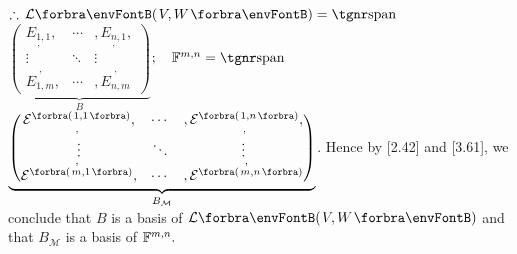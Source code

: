 \documentclass[a4paper, 11pt, UTF8]{article}
\begin{document}
\begin{large}
$\therefore\,\Lm{V,W}=\Spn${\normalsize$\underbrace{\begin{pmatrix} \underset{,}{E_{1,1}}, & \cdots & ,\underset{,}{E_{n,1}},\\ \vdots & \ddots & \vdots\\ \overset{,}{E_{1,m}}, & \cdots & ,\overset{,}{E_{n,m}}\end{pmatrix}}_{B}$}$;\quad\Fbb^{m,n}=\Spn${\normalsize$\envFontSmall[\scriptsize]\underbrace{\begin{pmatrix} \underset{,}{\mathcal{E}^{\Par{1,1}}}, & \cdots & ,\underset{,}{\mathcal{E}^{\Par{1,n}}},\\ \vdots & \ddots & \vdots\\ \overset{,}{\mathcal{E}^{\Par{m,1}}}, & \cdots & ,\overset{,}{\mathcal{E}^{\Par{m,n}}}\end{pmatrix}}_{B_{\mathcal{M}}}$}.\TextB{\vspace{12pt}}
Hence by [2.42] and [3.61], we conclude that $B$ is a basis of $\Lm{V,W}$ and that $B_{\mathcal{M}}$ is a basis of ${\mathbb{F}}^{m,n}.$\par
\SepLine


\end{large}
\end{document}
